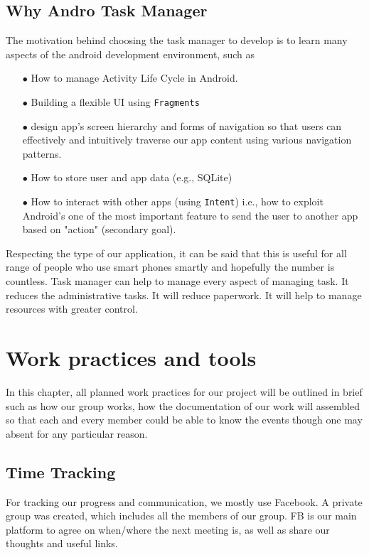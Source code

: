 \documentclass[10pt,a4paper]{report}
\begin{document}
\section{Why Andro Task Manager}

The motivation behind choosing the task manager to develop is to learn many aspects of the android development environment, such as

\begin{itemize}
  \item[$\bullet$] How to manage Activity Life Cycle in Android.
  \item[$\bullet$] Building a flexible UI using \texttt{Fragments}
  \item[$\bullet$] design app's screen hierarchy and forms of navigation so that users can effectively and intuitively traverse our app content using various navigation patterns.
  \item[$\bullet$] How to store user and app data (e.g., SQLite)
  \item[$\bullet$] How to interact with other apps (using \texttt{Intent}) i.e., how to exploit Android's one of the most important feature to send the user to another app based on "action" (secondary goal).
\end{itemize}


 Respecting the type of our application, it can be said that this is useful for all range of people who use smart phones smartly and hopefully the number is countless. Task manager can help to manage every aspect of managing task. It reduces the administrative tasks. It will reduce paperwork. It will help to manage resources with greater control.

\chapter{Work practices and tools}

In this chapter, all planned work practices for our project will be outlined in brief such as how our group works, how the documentation of our work will assembled so that each and every member could be able to know the events though one may absent for any particular reason.

\section{Time Tracking}
For tracking our progress and communication, we mostly use Facebook. A private group was created, which includes all the members of our group. FB is our main platform to agree on when/where the next meeting is, as well as share our thoughts and useful links.
\end{document}
